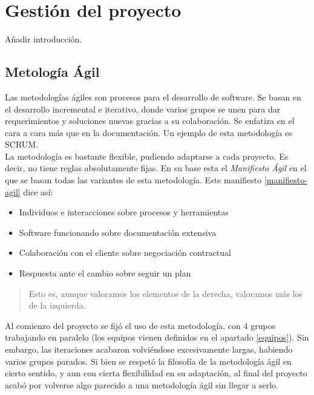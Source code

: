 
\chapter{Gestión del proyecto}
\label{gestion}

Añadir introducción.\\

\section{Metología Ágil}
\label{metodologia-agil}

Las metodologías ágiles son procesos para el desarrollo de software. Se basan en el desarrollo incremental e iterativo, donde varios grupos se unen para dar requerimientos y soluciones nuevas gracias a su colaboración. Se enfatiza en el cara a cara más que en la documentación. Un ejemplo de esta metodología es SCRUM.\\

La metodología es bastante flexible, pudiendo adaptarse a cada proyecto. Es decir, no tiene reglas absolutamente fijas. En su base esta el \textit{Manifiesto Ágil} en el que se basan todas las variantes de esta metodología. Este manifiesto \hyperref[manifiesto-agil]{\ref*{manifiesto-agil}} dice así:

\begin{itemize}
\item Individuos e interacciones sobre procesos y herramientas
\item Software funcionando sobre documentación extensiva
\item Colaboración con el cliente sobre negociación contractual
\item Respuesta ante el cambio sobre seguir un plan
\end{itemize}

\begin{quote}
\small Esto es, aunque valoramos los elementos de la derecha, valoramos más los de la izquierda.
\end{quote}

Al comienzo del proyecto se fijó el uso de esta metodología, con 4 grupos trabajando en paralelo (los equipos vienen definidos en el apartado \ref{equipos}). Sin embargo, las iteraciones acabaron volviéndose excesivamente largas, habiendo varios grupos parados. Si bien se respetó la filosofía de la metodología ágil en cierto sentido, y aun con cierta flexibilidad en su adaptación, al final del proyecto acabó por volverse algo parecido a una metodología ágil sin llegar a serlo.\\

